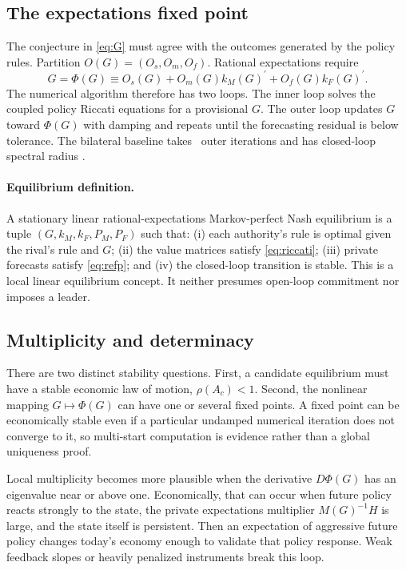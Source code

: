 \documentclass[11pt]{article}
\newcommand{\trans}{^{\prime}}
\begin{document}
\subsection{The expectations fixed point}

The conjecture in \eqref{eq:G} must agree with the outcomes generated by the
policy rules. Partition $O(G)=(O_s,O_m,O_f)$. Rational expectations require
\begin{equation}
G=\Phi(G)\equiv O_s(G)+O_m(G)k_M(G)\trans
                    +O_f(G)k_F(G)\trans.                  \label{eq:refp}
\end{equation}
The numerical algorithm therefore has two loops. The inner loop solves the
coupled policy Riccati equations for a provisional $G$. The outer loop updates
$G$ toward $\Phi(G)$ with damping and repeats until the forecasting residual is
below tolerance. The bilateral baseline takes
\NKBilateralOuterIterations\ outer iterations and has closed-loop spectral
radius \NKBilateralRadius.

\paragraph{Equilibrium definition.}
A stationary linear rational-expectations Markov-perfect Nash equilibrium is a
tuple $(G,k_M,k_F,P_M,P_F)$ such that: (i) each authority's rule is optimal
given the rival's rule and $G$; (ii) the value matrices satisfy
\eqref{eq:riccati}; (iii) private forecasts satisfy \eqref{eq:refp}; and (iv)
the closed-loop transition is stable. This is a local linear equilibrium
concept. It neither presumes open-loop commitment nor imposes a leader.

\subsection{Multiplicity and determinacy}

There are two distinct stability questions. First, a candidate equilibrium
must have a stable economic law of motion, $\rho(A_c)<1$. Second, the nonlinear
mapping $G\mapsto\Phi(G)$ can have one or several fixed points. A fixed point
can be economically stable even if a particular undamped numerical iteration
does not converge to it, so multi-start computation is evidence rather than a
global uniqueness proof.

Local multiplicity becomes more plausible when the derivative
$D\Phi(G)$ has an eigenvalue near or above one. Economically, that can occur
when future policy reacts strongly to the state, the private expectations
multiplier $M(G)^{-1}H$ is large, and the state itself is persistent. Then an
expectation of aggressive future policy changes today's economy enough to
validate that policy response. Weak feedback slopes or heavily penalized
instruments break this loop.
\end{document}
